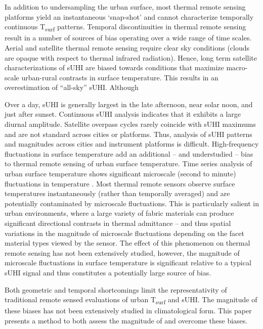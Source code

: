 In addition to undersampling the urban surface, most thermal remote sensing platforms yield an instantaneous ‘snap-shot’ and cannot characterize temporally continuous T\textsubscript{surf} patterns. Temporal discontinuities in thermal remote sensing result in a number of sources of bias operating over a wide range of time scales. Aerial and satellite thermal remote sensing require clear sky conditions (clouds are opaque with respect to thermal infrared radiation). Hence, long term satellite characterizations of sUHI are biased towards conditions that maximize macro-scale urban-rural contrasts in surface temperature. This results in an overestimation of “all-sky” sUHI. Although

Over a day, sUHI is generally largest in the late afternoon, near solar noon, and just after sunset. Continuous sUHI analysis indicates that it exhibits a large diurnal amplitude. Satellite overpass cycles rarely coincide with sUHI maximums and are not standard across cities or platforms. Thus, analysis of sUHI patterns and magnitudes across cities and instrument platforms is difficult.  High-frequency fluctuations in surface temperature add an additional – and understudied – bias to thermal remote sensing of urban surface temperature. Time series analysis of urban surface temperature shows significant microscale (second to minute) fluctuations in temperature \cite{Christen2012}. Most thermal remote sensors observe surface temperatures instantaneously (rather than temporally averaged) and are potentially contaminated by microscale fluctuations. This is particularly salient in urban environments, where a large variety of fabric materials can produce significant directional contrasts in thermal admittance – and thus spatial variations in the magnitude of microscale fluctuations depending on the facet material types viewed by the sensor. The effect of this phenomenon on thermal remote sensing has not been extensively studied, however, the magnitude of microscale fluctuations in surface temperature is significant relative to a typical sUHI signal and thus constitutes a potentially large source of bias.

Both geometric and temporal shortcomings limit the representativity of traditional remote sensed evaluations of urban T\textsubscript{surf} and sUHI. The magnitude of these biases has not been extensively studied in climatological form. This paper presents a method to both assess the magnitude of and overcome these biases.